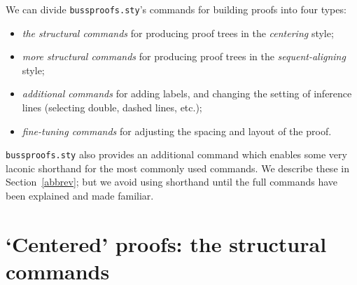 \documentclass[11pt]{article}
\begin{document}
We can divide {\texttt{bussproofs.sty}}'s  commands for building  proofs into four types:
\begin{itemize}\setlength{\itemsep}{0.0in}
\item \emph{the structural commands} for producing proof trees in the  \emph{centering} style;
\item \emph{more structural commands} for producing proof trees in the  \emph{sequent-aligning} style;
\item \emph{additional commands} for adding labels, and changing the setting of inference lines (selecting double, dashed lines, etc.);
\item \emph{fine-tuning commands} for adjusting the spacing and layout of the proof. 
\end{itemize}
{\texttt{bussproofs.sty}} also provides an additional command which enables some very laconic shorthand for the most commonly used commands. We describe these in Section~\ref{abbrev}; but we avoid using shorthand until the full commands have been explained and made familiar.



\section{`Centered' proofs: the structural commands}
\end{document}
